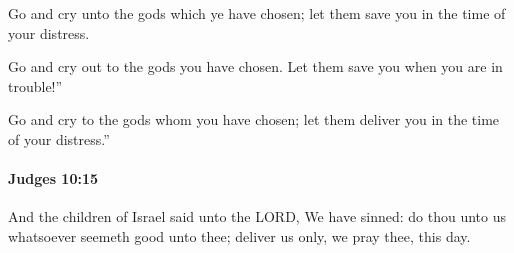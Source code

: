 			\begin{versebox}
					\item[BHS] 
					\item[ASV] Go and cry unto the gods which ye have chosen; let them save you in the time of your distress.
					\item[NIV] Go and cry out to the gods you have chosen. Let them save you when you are in trouble!”
					\item[NRSV] Go and cry to the gods whom you have chosen; let them deliver you in the time of your distress.”
			\end{versebox}

		\paragraph{Judges 10:15} %
			\label{JUDGES-10-15}

			And the children of Israel said unto the LORD, We have sinned: do thou unto us whatsoever seemeth good unto thee; deliver us only, we pray thee, this day.


